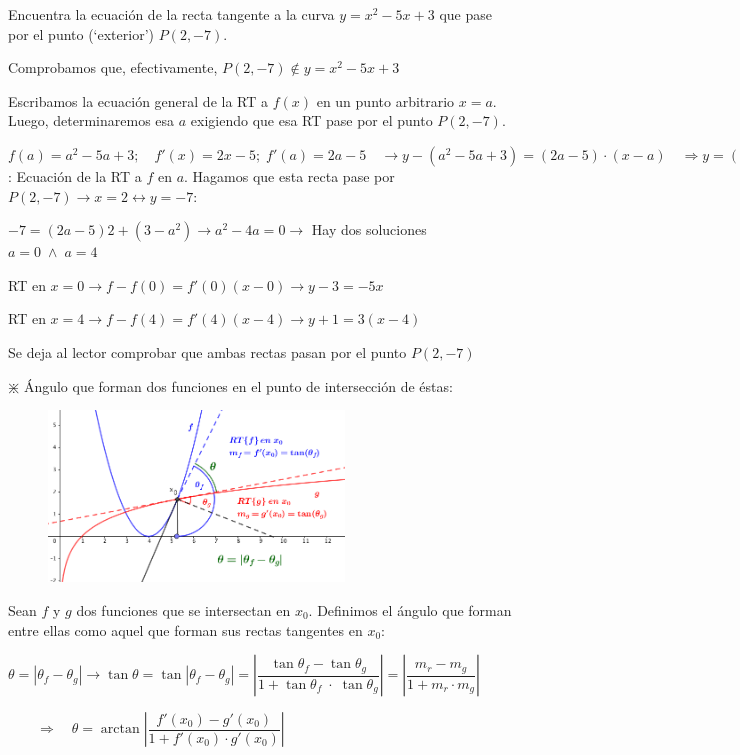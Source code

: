 	
	\begin{ejem}
		Encuentra la ecuación de la recta tangente a la curva $y=x^2-5x+3$ que pase por el punto (`exterior') $P(2,-7)$.
		
		Comprobamos que, efectivamente, $P(2,-7) \notin y=x^2-5x+3$
	
	Escribamos la ecuación general de la RT a $f(x)$ en un punto arbitrario $x=a$. Luego, determinaremos esa $a$ exigiendo que esa RT pase por el punto  $P(2,-7)$.
	
	$f(a)=a^2-5a+3;\quad f'(x)=2x-5; \; f'(a)=2a-5 \quad \to y-(a^2-5a+3)=(2a-5)\cdot (x-a) \quad \Rightarrow y=(2a-5)x+(3-a^2)\; $: Ecuación de la RT a $f$ en $a$. Hagamos que esta recta pase por $P(2,-7) \to x=2 \leftrightarrow y=-7$:
	
	$-7=(2a-5)2+(3-a^2)\to a^2-4a=0 \to $ Hay dos soluciones $a=0\; \wedge \; a=4$
	
	RT en $x=0 \to f-f(0)=f'(0)(x-0) \to y-3=-5x$
	
	RT en $x=4 \to f-f(4)=f'(4)(x-4) \to y+1=3(x-4)$
	
	Se deja al lector comprobar que ambas rectas pasan por el punto $P(2,-7)$
	
	\end{ejem}



	\begin{defi}{$\divideontimes$  Ángulo que forman dos funciones en el punto de intersección de éstas:}
	
	\begin{figure}[H]
		\centering
		\includegraphics[width=0.7\textwidth]{imagenes/imagenes05/T05IM13.png}
	\end{figure}
	
	Sean $f$ y $g$ dos funciones que se intersectan en $x_0$. Definimos el ángulo que forman entre ellas como aquel que forman sus rectas tangentes en $x_0$:
	
	$\theta =|\theta_{f}-\theta_{g}| \to \tan \theta = \tan |\theta_{f}-\theta_{g}| =\left| \dfrac {\tan \theta_{f}-\tan \theta_{g}}{1+\tan \theta_{f}\; \cdot \; \tan \theta_{g} } \right| = \left| \dfrac {m_r - m_g}{1+m_r \cdot m_g } \right|$
	
	$\qquad \Rightarrow \quad \theta = \arctan \left| \dfrac {f'(x_0)-g'(x_0)}{1+f'(x_0)\cdot g'(x_0)}  \right|$

	\end{defi}

